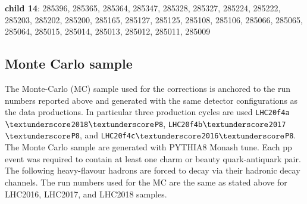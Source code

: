 \begin{itemize}
	\textbf{child 14}: 285396, 285365, 285364, 285347, 285328, 285327, 285224, 285222, 285203, 285202, 285200, 285165, 285127, 285125, 285108, 285106, 285066, 285065, 285064, 285015, 285014, 285013, 285012, 285011, 285009


\end{itemize}

\subsection{Monte Carlo sample}
\label{sec:mc_sample}
The Monte-Carlo (MC) sample used for the corrections is anchored to the run numbers reported above and generated with the same detector configurations as the data productions. In particular three production cycles are used  \texttt{LHC20f4a$\textunderscore$2018$\textunderscore$P8}, \texttt{LHC20f4b$\textunderscore$2017$\textunderscore$P8}, and \texttt{LHC20f4c$\textunderscore$2016$\textunderscore$P8}. The Monte Carlo sample are generated with PYTHIA8 Monash tune. Each pp event was required to contain at least one charm or beauty quark-antiquark pair. The following heavy-flavour hadrons are forced to decay via their hadronic decay channels. The run numbers used for the MC are the same as stated above for LHC2016, LHC2017, and LHC2018 samples.




